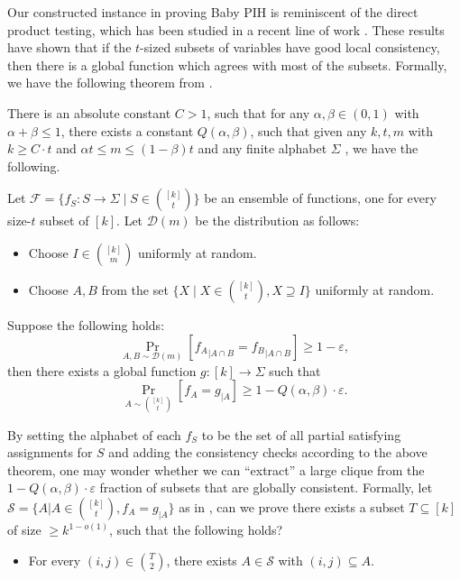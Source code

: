 Our constructed instance in proving Baby PIH is reminiscent of the direct product testing, which has been studied in a recent line of work \cite{DS14, DK17, DFH19}. These results have shown that if the $t$-sized subsets of variables have good local consistency, then there is a global function which agrees with most of the subsets. Formally, we have the following theorem from \cite{DFH19}.

\begin{theorem}
\label{thm:dir}
    There is an absolute constant $C>1$, such that for any $\alpha,\beta \in (0,1)$ with $\alpha+\beta \le 1$, there exists a constant $Q(\alpha,\beta)$, such that given any $k,t,m$ with $k \ge C \cdot t$ and $\alpha t \le m \le (1-\beta) t$ and any finite alphabet $\Sigma$ , we have the following.

    Let $\mathcal F=\{f_S:S \rightarrow \Sigma \mid S \in \binom{[k]}{t}\}$ be an ensemble of functions, one for every size-$t$ subset of $[k]$. Let $\mathcal D(m)$ be the distribution as follows:
    \begin{itemize}
        \item Choose $I \in \binom{[k]}{m}$ uniformly at random.
        \item Choose $A,B$ from the set $\{X \mid X \in \binom{[k]}{t}, X \supseteq I\}$ uniformly at random.
    \end{itemize}

    Suppose the following holds:
    \[
    \Pr_{A,B \sim \mathcal D(m)}[{f_A}_{|A \cap B} = {f_B}_{|A \cap B}] \ge 1-\varepsilon,
    \]
    then there exists a global function $g: [k] \rightarrow \Sigma$ such that
    \[
    \Pr_{A \sim \binom{[k]}{t}}[f_A = g_{|A}] \ge 1-Q(\alpha,\beta) \cdot \varepsilon.
    \]
\end{theorem}

By setting the alphabet of each $f_S$ to be the set of all partial satisfying assignments for $S$ and adding the consistency checks according to the above theorem, one may wonder whether we can ``extract'' a large clique from the $1-Q(\alpha,\beta)\cdot \varepsilon$ fraction of subsets that are globally consistent. Formally, let $\mathcal S=\{A | A \in \binom{[k]}{t} , f_A=g_{|A}\}$ as in , can we prove there exists a subset $T \subseteq [k]$ of size $\ge k^{1-o(1)}$, such that the following holds?
\begin{itemize}
    \item For every $(i,j) \in \binom{T}{2}$, there exists $A \in \mathcal S$ with $(i,j) \subseteq A$.
\end{itemize}


